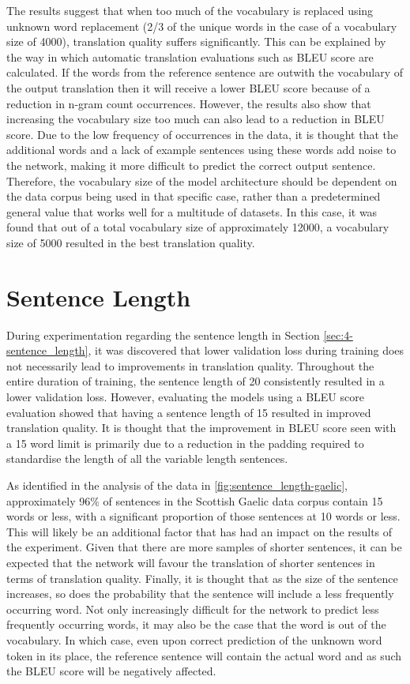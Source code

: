 The results suggest that when too much of the vocabulary is replaced using unknown word replacement (2/3 of the unique words in the case of a vocabulary size of 4000), translation quality suffers significantly. This can be explained by the way in which automatic translation evaluations such as \acrshort{BLEU} score are calculated. If the words from the reference sentence are outwith the vocabulary of the output translation then it will receive a lower \acrshort{BLEU} score because of a reduction in n-gram count occurrences. However, the results also show that increasing the vocabulary size too much can also lead to a reduction in \acrshort{BLEU} score. Due to the low frequency of occurrences in the data, it is thought that the additional words and a lack of example sentences using these words add noise to the network, making it more difficult to predict the correct output sentence. Therefore, the vocabulary size of the model architecture should be dependent on the data corpus being used in that specific case, rather than a predetermined general value that works well for a multitude of datasets. In this case, it was found that out of a total vocabulary size of approximately 12000, a vocabulary size of 5000 resulted in the best translation quality.

\section{Sentence Length}

During experimentation regarding the sentence length in Section \ref{sec:4-sentence_length}, it was discovered that lower validation loss during training does not necessarily lead to improvements in translation quality. Throughout the entire duration of training, the sentence length of 20 consistently resulted in a lower validation loss. However, evaluating the models using a \acrshort{BLEU} score evaluation showed that having a sentence length of 15 resulted in improved translation quality. It is thought that the improvement in \acrshort{BLEU} score seen with a 15 word limit is primarily due to a reduction in the padding required to standardise the length of all the variable length sentences.

As identified in the analysis of the data in \ref{fig:sentence_length-gaelic}, approximately 96\% of sentences in the Scottish Gaelic data corpus contain 15 words or less, with a significant proportion of those sentences at 10 words or less. This will likely be an additional factor that has had an impact on the results of the experiment. Given that there are more samples of shorter sentences, it can be expected that the network will favour the translation of shorter sentences in terms of translation quality. Finally, it is thought that as the size of the sentence increases, so does the probability that the sentence will include a less frequently occurring word. Not only increasingly difficult for the network to predict less frequently occurring words, it may also be the case that the word is out of the vocabulary. In which case, even upon correct prediction of the unknown word token in its place, the reference sentence will contain the actual word and as such the \acrshort{BLEU} score will be negatively affected.

